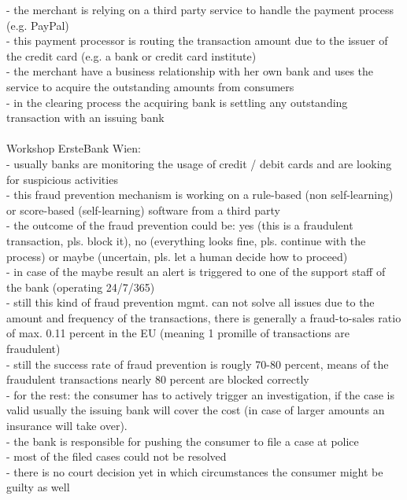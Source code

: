 - the merchant is relying on a third party service to handle the payment process (e.g. PayPal) \\
- this payment processor is routing the transaction amount due to the issuer of the credit card (e.g. a bank or credit card institute) \\
- the merchant have a business relationship with her own bank and uses the service to acquire the outstanding amounts from consumers \\
- in the clearing process the acquiring bank is settling any outstanding transaction with an issuing bank \\
\\
Workshop ErsteBank Wien: \\
- usually banks are monitoring the usage of credit / debit cards and are looking for suspicious activities \\
- this fraud prevention mechanism is working on a rule-based (non self-learning) or score-based (self-learning) software from a third party \\
- the outcome of the fraud prevention could be: yes (this is a fraudulent transaction, pls. block it), no (everything looks fine, pls. continue with the process) or maybe (uncertain, pls. let a human decide how to proceed) \\
- in case of the maybe result an alert is triggered to one of the support staff of the bank (operating 24/7/365) \\
- still this kind of fraud prevention mgmt. can not solve all issues due to the amount and frequency of the transactions, there is generally a
fraud-to-sales ratio of max. 0.11 percent in the EU (meaning 1 promille of transactions are fraudulent) \\
- still the success rate of fraud prevention is rougly 70-80 percent, means of the fraudulent transactions nearly 80 percent are blocked correctly \\
- for the rest: the consumer has to actively trigger an investigation, if the case is valid usually the issuing bank will cover the cost (in case of larger amounts an insurance will take over). \\
- the bank is responsible for pushing the consumer to file a case at police \\
- most of the filed cases could not be resolved \\
- there is no court decision yet in which circumstances the consumer might be guilty as well \\
\\
